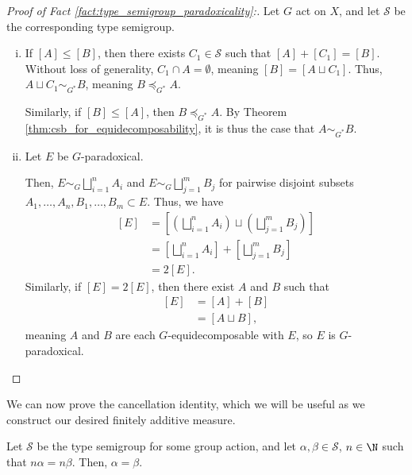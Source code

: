 \begin{proof}[Proof of Fact \ref{fact:type_semigroup_paradoxicality}:]
  Let $G$ act on $X$, and let $\mathcal{S}$ be the corresponding type semigroup.
  \begin{enumerate}[(i)]
    \item If $\left[A\right]\leq \left[B\right]$, then there exists $C_1\in \mathcal{S}$ such that $\left[A\right] + \left[C_1\right] = \left[B\right]$. Without loss of generality, $C_1\cap A= \emptyset$, meaning $\left[B\right] = \left[A\sqcup C_1\right]$. Thus, $A\sqcup C_1 \sim_{G^{\ast}} B$, meaning $B\preceq_{G^{\ast}}A$.\newline

      Similarly, if $\left[B\right]\leq \left[A\right]$, then $B\preceq_{G^{\ast}}A$. By Theorem \ref{thm:csb_for_equidecomposability}, it is thus the case that $A\sim_{G^{\ast}}B$.
    \item Let $E$ be $G$-paradoxical. \newline

      Then, $E\sim_{G}\bigsqcup_{i=1}^{n}A_i$ and $E \sim_{G}\bigsqcup_{j=1}^{m}B_j$ for pairwise disjoint subsets $A_1,\dots,A_n,B_1,\dots,B_m\subset E$. Thus, we have
      \begin{align*}
        \left[E\right] &= \left[\left(\bigsqcup_{i=1}^{n}A_i\right)\sqcup \left(\bigsqcup_{j=1}^{m}B_j\right)\right]\\
                       &= \left[\bigsqcup_{i=1}^{n}A_i\right] + \left[\bigsqcup_{j=1}^{m}B_j\right]\\
                       &= 2\left[E\right].
      \end{align*}
      Similarly, if $\left[E\right] = 2\left[E\right]$, then there exist $A$ and $B$ such that
      \begin{align*}
        \left[E\right] &= \left[A\right] + \left[B\right]\\
                       &= \left[A\sqcup B\right],
      \end{align*}
      meaning $A$ and $B$ are each $G$-equidecomposable with $E$, so $E$ is $G$-paradoxical.
  \end{enumerate}
\end{proof}
We can now prove the cancellation identity, which we will be useful as we construct our desired finitely additive measure.
\begin{theorem}
  Let $\mathcal{S}$ be the type semigroup for some group action, and let $\alpha,\beta\in \mathcal{S}$, $n\in \N$ such that $n\alpha = n\beta$. Then, $\alpha = \beta$.
\end{theorem}
